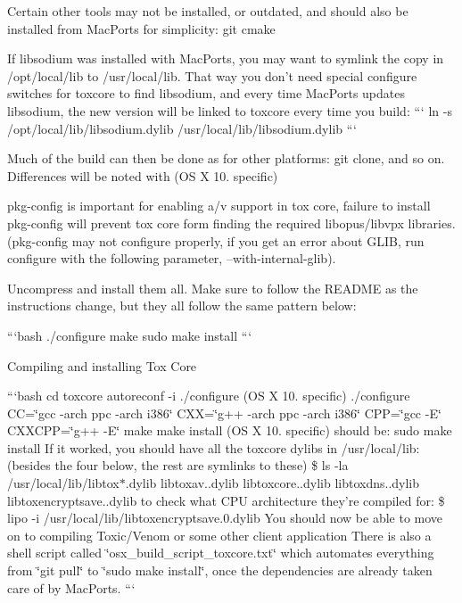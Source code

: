 Certain other tools may not be installed, or outdated, and should also be installed from Mac\+Ports for simplicity\+: git cmake

If libsodium was installed with Mac\+Ports, you may want to symlink the copy in /opt/local/lib to /usr/local/lib. That way you don't need special configure switches for toxcore to find libsodium, and every time Mac\+Ports updates libsodium, the new version will be linked to toxcore every time you build\+: ``` ln -\/s /opt/local/lib/libsodium.dylib /usr/local/lib/libsodium.dylib ```

Much of the build can then be done as for other platforms\+: git clone, and so on. Differences will be noted with (O\+S X 10. specific)

pkg-\/config is important for enabling a/v support in tox core, failure to install pkg-\/config will prevent tox core form finding the required libopus/libvpx libraries. (pkg-\/config may not configure properly, if you get an error about G\+L\+I\+B, run configure with the following parameter, --with-\/internal-\/glib).

Uncompress and install them all. Make sure to follow the R\+E\+A\+D\+M\+E as the instructions change, but they all follow the same pattern below\+:

```bash ./configure make sudo make install ```

Compiling and installing Tox Core

```bash cd toxcore autoreconf -\/i ./configure (O\+S X 10. specific) ./configure C\+C=\char`\"{}gcc -\/arch ppc -\/arch i386\char`\"{} C\+X\+X=\char`\"{}g++ -\/arch ppc -\/arch i386\char`\"{} C\+P\+P=\char`\"{}gcc -\/\+E\char`\"{} C\+X\+X\+C\+P\+P=\char`\"{}g++ -\/\+E\char`\"{} make make install (O\+S X 10. specific) should be\+: sudo make install If it worked, you should have all the toxcore dylibs in /usr/local/lib\+: (besides the four below, the rest are symlinks to these) \$ ls -\/la /usr/local/lib/libtox$\ast$.dylib libtoxav..\+dylib libtoxcore..\+dylib libtoxdns..\+dylib libtoxencryptsave..\+dylib to check what C\+P\+U architecture they're compiled for\+: \$ lipo -\/i /usr/local/lib/libtoxencryptsave.0.\+dylib You should now be able to move on to compiling Toxic/\+Venom or some other client application There is also a shell script called \char`\"{}osx\+\_\+build\+\_\+script\+\_\+toxcore.\+txt\char`\"{} which automates everything from \char`\"{}git pull\char`\"{} to \char`\"{}sudo make install\char`\"{}, once the dependencies are already taken care of by Mac\+Ports. ```

